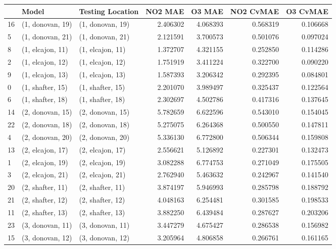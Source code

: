\begin{tabular}{lllrrrr}
\toprule
{} &             Model &  Testing Location &   NO2 MAE &    O3 MAE &  NO2 CvMAE &  O3 CvMAE \\
\midrule
16 &  (1, donovan, 19) &  (1, donovan, 19) &  2.406302 &  4.068393 &   0.568319 &  0.106668 \\
5  &  (1, donovan, 21) &  (1, donovan, 21) &  2.121591 &  3.700573 &   0.501076 &  0.097024 \\
8  &  (1, elcajon, 11) &  (1, elcajon, 11) &  1.372707 &  4.321155 &   0.252850 &  0.114286 \\
2  &  (1, elcajon, 12) &  (1, elcajon, 12) &  1.751919 &  3.411224 &   0.322700 &  0.090220 \\
9  &  (1, elcajon, 13) &  (1, elcajon, 13) &  1.587393 &  3.206342 &   0.292395 &  0.084801 \\
0  &  (1, shafter, 15) &  (1, shafter, 15) &  2.201070 &  3.989497 &   0.325437 &  0.122564 \\
6  &  (1, shafter, 18) &  (1, shafter, 18) &  2.302697 &  4.502786 &   0.417316 &  0.137645 \\
14 &  (2, donovan, 15) &  (2, donovan, 15) &  5.782659 &  6.622596 &   0.543010 &  0.154045 \\
22 &  (2, donovan, 18) &  (2, donovan, 18) &  5.275075 &  6.264368 &   0.500550 &  0.147811 \\
4  &  (2, donovan, 20) &  (2, donovan, 20) &  5.336130 &  6.772800 &   0.506344 &  0.159808 \\
13 &  (2, elcajon, 17) &  (2, elcajon, 17) &  2.556621 &  5.126892 &   0.227301 &  0.132473 \\
1  &  (2, elcajon, 19) &  (2, elcajon, 19) &  3.082288 &  6.774753 &   0.271049 &  0.175505 \\
3  &  (2, elcajon, 21) &  (2, elcajon, 21) &  2.762940 &  5.463632 &   0.242967 &  0.141540 \\
20 &  (2, shafter, 11) &  (2, shafter, 11) &  3.874197 &  5.946993 &   0.285798 &  0.188792 \\
21 &  (2, shafter, 12) &  (2, shafter, 12) &  4.048163 &  6.254481 &   0.301585 &  0.198533 \\
11 &  (2, shafter, 13) &  (2, shafter, 13) &  3.882250 &  6.439484 &   0.287627 &  0.203206 \\
23 &  (3, donovan, 11) &  (3, donovan, 11) &  3.447279 &  4.675427 &   0.286538 &  0.156982 \\
15 &  (3, donovan, 12) &  (3, donovan, 12) &  3.205964 &  4.806858 &   0.266761 &  0.161165 \\

\end{tabular}
